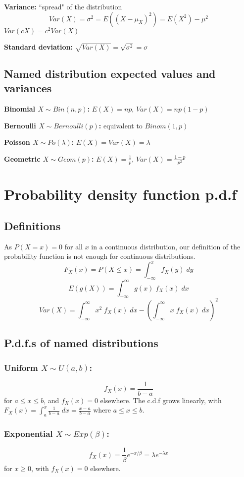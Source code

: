 \documentclass[15pt]{article}
\begin{document}
\textbf{Variance:} ``spread" of the distribution
\[
    Var(X) = \sigma^2 = E((X - \mu_X)^2) = E(X^2) - \mu^2
\]
$Var(cX) = c^2 Var(X)$

\textbf{Standard deviation:} $\sqrt{Var(X)} = \sqrt{\sigma^2} = \sigma$

\subsection{Named distribution expected values and variances}
\textbf{Binomial $X \sim Bin(n,p)$:} $E(X) = np$, $Var(X) = np(1-p)$

\textbf{Bernoulli $X \sim Bernoulli(p)$:} equivalent to $Binom(1,p)$

\textbf{Poisson $X \sim Po(\lambda)$:} $E(X) = Var(X) = \lambda$

\textbf{Geometric $X \sim Geom(p)$:} $E(X) = \frac{1}{p}$, $Var(X) = \frac{1-p}{p^2}$

\section{Probability density function p.d.f}
\subsection{Definitions}
As $P(X = x) = 0$ for all $x$ in a continuous distribution, our definition of the probability function is not enough for continuous distributions.
\[
    F_X (x) = P(X \leq x) = \int_{-\infty}^{x} f_X (y) \; dy
\]
\[
    E(g(X)) = \int_{-\infty}^{\infty} g(x) \; f_X (x) \; dx
\]
\[
    Var(X) = \int_{-\infty}^{\infty} x^2 \; f_X (x) \; dx - \left(\int_{-\infty}^{\infty} x \; f_X (x) \; dx \right)^2
\]
\subsection{P.d.f.s of named distributions}
\subsubsection{Uniform $X \sim U(a,b)$:}
\[
	f_X (x) =  \frac{1}{b-a}
\] for $a \leq x \leq b$, and $f_X (x) = 0$ elsewhere.
The c.d.f grows linearly, with $F_X (x) = \int_a^x \frac{1}{b-a} \; dx = \frac{x - a}{b-a}$ where $a \leq x \leq b$.

\subsubsection{Exponential $X \sim Exp(\beta)$:}
\[
    f_X (x) = \frac{1}{\beta} e^{-x / \beta} = \lambda e^{-\lambda x}
\] for $x \geq 0$, with $f_X (x) = 0$ elsewhere.
\end{document}
